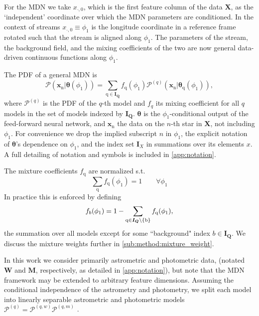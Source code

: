 \documentclass[twocolumn]{aastex631}
\newcommand{\mrm}[1]{\mathrm{#1}}
\newcommand{\mbs}[1]{\boldsymbol{#1}}
\newcommand{\mbf}[1]{\mathbf{#1}}
\newcommand{\mcal}[1]{\mathcal{#1}}
\newcommand{\pdf}{\mcal{P}}
\newcommand{\prior}{\mcal{\pi}}
\newcommand{\nth}[1]{{#1}_{\mrm{n}}}  %
\newcommand{\qth}[1]{{#1}_{\mrm{q}}}  %
\newcommand{\smallcomponent}[2]{#2^{\scriptscriptstyle (#1)}}
\newcommand{\cmp}[2]{\smallcomponent{#1}{#2}}
\begin{document}
        For the MDN we take $x_{\cdot, 0}$, which is the first feature column of
        the data $\mbf{X}$, as the `independent' coordinate over which the MDN
        parameters are conditioned. In the context of streams $x_{\cdot, 0}
        \equiv \phi_1$ is the longitude coordinate in a reference frame rotated
        such that the stream is aligned along $\phi_1$. The parameters of the
        stream, the background field, and the mixing coefficients of the two are
        now general data-driven continuous functions along $\phi_1$.

        The PDF of a general MDN is
        \begin{equation} \label{eq:general_mixture_network}
            \!\!\! \pdf(\nth{\mbs{x}} | \mbs{\theta}(\phi_1))
            \!=\! \sum_{\mrm{q} \in \mbs{I_Q}} \! \qth{f}(\phi_1) \cmp{q}{\pdf}(\nth{\mbs{x}}|\qth{\mbs{\theta}}(\phi_1)),
        \end{equation}
        where $\cmp{q}{\pdf}$ is the PDF of the $q$-th model and $f_q$ its
        mixing coefficient for all $q$ models in the set of models indexed by
        $\mbs{I_Q}$. $\mbs{\theta}$ is the $\phi_1$-conditional output of the
        feed-forward neural network, and $\nth{\mbs{x}}$ the data on the $n$-th
        star in $\mbs{X}$, not including $\phi_1$. For convenience we drop the
        implied subscript $n$ in $\phi_1$, the explicit notation of
        $\mbs{\theta}$'s dependence on $\phi_1$, and the index set $\mbs{I}_X$
        in summations over its elements $x$. A full detailing of notation and
        symbols is included in \autoref{app:notation}.

        The mixture coefficients $\qth{f}$ are normalized s.t.
        \begin{equation}
            \sum_{\mrm{q}} \qth{f}(\phi_1) = 1 \qquad \forall \phi_1
        \end{equation}
        In practice this is enforced by defining
        \begin{equation} \label{eq:mixture_weight_normalization}
            f_{b}(\phi_1) = 1 - \sum_{\rm{q}\in \mbs{I_Q}\backslash \{b\}} \qth{f}(\phi_1),
        \end{equation}
        the summation over all models except for some ``background" index $b \in
        \mbs{I_Q}$.  We discuss the mixture weights further in
        \autoref{sub:method:mixture_weight}.

        In this work we consider primarily astrometric and photometric data,
        (notated $\mbs{W}$ and $\mbs{M}$, respectively, as detailed in
        \autoref{app:notation}), but note that the MDN framework may be extended
        to arbitrary feature dimensions.  Assuming the conditional independence
        of the astrometry and photometry, we split each model into linearly
        separable astrometric and photometric models $\cmp{q}{\pdf} =
        \cmp{q,w}{\pdf} \cmp{q,m}{\pdf}$ .
\end{document}
